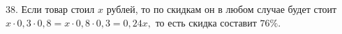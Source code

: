 38. Если товар стоил $x$ рублей, то по скидкам он в любом случае будет стоит $x\cdot0,3\cdot0,8=x\cdot0,8\cdot0,3=0,24x,$ то есть скидка составит $76\%.$\\
